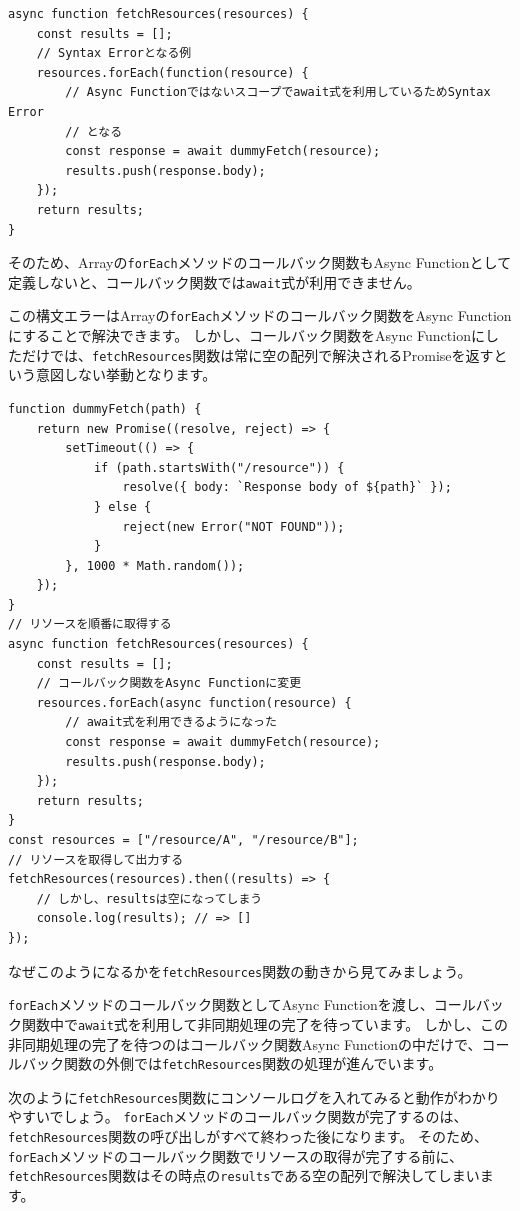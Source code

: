 \begin{lstlisting}
async function fetchResources(resources) {
    const results = [];
    // Syntax Errorとなる例
    resources.forEach(function(resource) {
        // Async Functionではないスコープでawait式を利用しているためSyntax Error
        // となる
        const response = await dummyFetch(resource);
        results.push(response.body);
    });
    return results;
}
\end{lstlisting}

そのため、Arrayの\texttt{forEach}メソッドのコールバック関数もAsync Functionとして定義しないと、コールバック関数では\texttt{await}式が利用できません。

この構文エラーはArrayの\texttt{forEach}メソッドのコールバック関数をAsync Functionにすることで解決できます。 しかし、コールバック関数をAsync Functionにしただけでは、\texttt{fetchResources}関数は常に空の配列で解決されるPromiseを返すという意図しない挙動となります。

\begin{lstlisting}
function dummyFetch(path) {
    return new Promise((resolve, reject) => {
        setTimeout(() => {
            if (path.startsWith("/resource")) {
                resolve({ body: `Response body of ${path}` });
            } else {
                reject(new Error("NOT FOUND"));
            }
        }, 1000 * Math.random());
    });
}
// リソースを順番に取得する
async function fetchResources(resources) {
    const results = [];
    // コールバック関数をAsync Functionに変更
    resources.forEach(async function(resource) {
        // await式を利用できるようになった
        const response = await dummyFetch(resource);
        results.push(response.body);
    });
    return results;
}
const resources = ["/resource/A", "/resource/B"];
// リソースを取得して出力する
fetchResources(resources).then((results) => {
    // しかし、resultsは空になってしまう
    console.log(results); // => []
});
\end{lstlisting}

なぜこのようになるかを\texttt{fetchResources}関数の動きから見てみましょう。

\texttt{forEach}メソッドのコールバック関数としてAsync
Functionを渡し、コールバック関数中で\texttt{await}式を利用して非同期処理の完了を待っています。
しかし、この非同期処理の完了を待つのはコールバック関数Async
Functionの中だけで、コールバック関数の外側では\texttt{fetchResources}関数の処理が進んでいます。

次のように\texttt{fetchResources}関数にコンソールログを入れてみると動作がわかりやすいでしょう。
\texttt{forEach}メソッドのコールバック関数が完了するのは、\texttt{fetchResources}関数の呼び出しがすべて終わった後になります。
そのため、\texttt{forEach}メソッドのコールバック関数でリソースの取得が完了する前に、\texttt{fetchResources}関数はその時点の\texttt{results}である空の配列で解決してしまいます。

